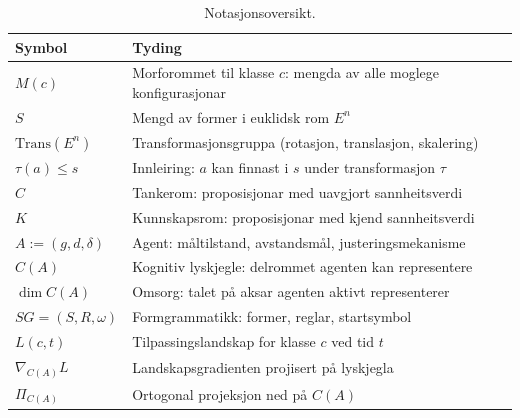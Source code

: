 \begin{table}[!t]
\centering
\caption{Notasjonsoversikt.}
\label{tab:notation}
\small
\begin{tabularx}{\columnwidth}{@{}l >{\raggedright\arraybackslash}X@{}}
\toprule
\textbf{Symbol} & \textbf{Tyding} \\
\midrule
$M(c)$ & Morforommet til klasse $c$: mengda av alle moglege konfigurasjonar \\[2pt]
$S$ & Mengd av former i euklidsk rom $E^n$ \\[2pt]
$\mathrm{Trans}(E^n)$ & Transformasjonsgruppa (rotasjon, translasjon, skalering) \\[2pt]
$\tau(a) \leq s$ & Innleiring: $a$ kan finnast i $s$ under transformasjon $\tau$ \\[2pt]
$C$ & Tankerom: proposisjonar med uavgjort sannheitsverdi \\[2pt]
$K$ & Kunnskapsrom: proposisjonar med kjend sannheitsverdi \\[2pt]
$A := (g,d,\delta)$ & Agent: måltilstand, avstandsmål, justeringsmekanisme \\[2pt]
$C(A)$ & Kognitiv lyskjegle: delrommet agenten kan representere \\[2pt]
$\dim C(A)$ & Omsorg: talet på aksar agenten aktivt representerer \\[2pt]
$SG = (S,R,\omega)$ & Formgrammatikk: former, reglar, startsymbol \\[2pt]
$L(c,t)$ & Tilpassingslandskap for klasse $c$ ved tid $t$ \\[2pt]
$\nabla_{C(A)} L$ & Landskapsgradienten projisert på lyskjegla \\[2pt]
$\Pi_{C(A)}$ & Ortogonal projeksjon ned på $C(A)$ \\
\bottomrule
\end{tabularx}
\end{table}
